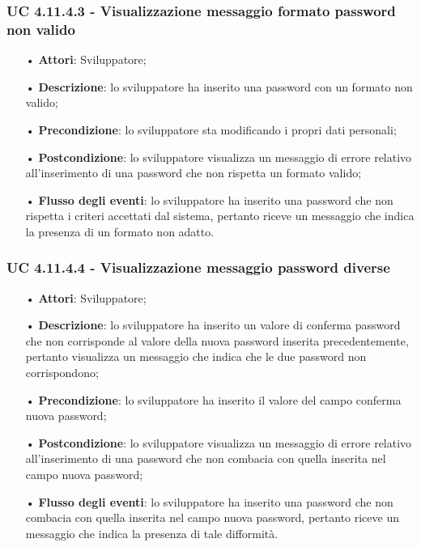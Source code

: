 \subsubsection{UC 4.11.4.3 - Visualizzazione messaggio formato password non valido}
\begin{itemize}
	\item[•]\textbf{Attori}: Sviluppatore;
	\item[•]\textbf{Descrizione}: lo sviluppatore ha inserito una password con un formato non valido;
	\item[•]\textbf{Precondizione}: lo sviluppatore sta modificando i propri dati personali;
	\item[•]\textbf{Postcondizione}: lo sviluppatore visualizza un messaggio di errore relativo all'inserimento di una password che non rispetta un formato valido; 
	\item[•]\textbf{Flusso degli eventi}: lo sviluppatore ha inserito una password che non rispetta i criteri accettati dal sistema, pertanto riceve un messaggio che indica la presenza di un formato non adatto.
\end{itemize}

\subsubsection{UC 4.11.4.4 - Visualizzazione messaggio password diverse}
\begin{itemize}
	\item[•]\textbf{Attori}: Sviluppatore;
	\item[•]\textbf{Descrizione}: lo sviluppatore ha inserito un valore di conferma password che non corrisponde al valore della nuova password inserita precedentemente, pertanto visualizza un messaggio che indica che le due password non corrispondono;
	\item[•]\textbf{Precondizione}: lo sviluppatore ha inserito il valore del campo conferma nuova password;
	\item[•]\textbf{Postcondizione}: lo sviluppatore visualizza un messaggio di errore relativo all'inserimento di una password che non combacia con quella inserita nel campo nuova password; 
	\item[•]\textbf{Flusso degli eventi}: lo sviluppatore ha inserito una password che non combacia con quella inserita nel campo nuova password, pertanto riceve un messaggio che indica la presenza di tale difformità.
\end{itemize}

